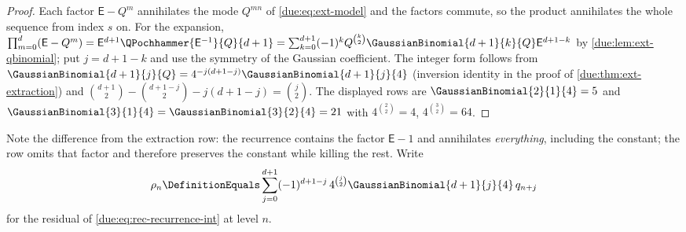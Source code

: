 \documentclass[11pt,oneside]{article}
\theoremstyle{plain}
\theoremstyle{definition}
\theoremstyle{remark}
\newcommand{\upn}[1]{\RvachevUp_{#1}}
\newcommand{\Qq}{Q}                                         %
\newcommand{\qn}[1]{q_{#1}}                                 %
\begin{document}
\begin{proof}
Each factor $\mathsf E-\Qq^{m}$ annihilates the mode $\Qq^{mn}$ of
\cref{due:eq:ext-model} and the factors commute, so the product annihilates
the whole sequence from index $s$ on.  For the expansion,
$\prod_{m=0}^{d}(\mathsf E-\Qq^{m})=\mathsf E^{d+1}\QPochhammer{\mathsf E^{-1}}{\Qq}{d+1}
=\sum_{k=0}^{d+1}(-1)^{k}\Qq^{\binom{k}{2}}\GaussianBinomial{d+1}{k}{\Qq}\mathsf E^{d+1-k}$
by \cref{due:lem:ext-qbinomial}; put $j=d+1-k$ and use the symmetry of the
Gaussian coefficient.  The integer form follows from
$\GaussianBinomial{d+1}{j}{\Qq}=4^{-j(d+1-j)}\GaussianBinomial{d+1}{j}{4}$
(inversion identity in the proof of \cref{due:thm:ext-extraction}) and
$\binom{d+1}{2}-\binom{d+1-j}{2}-j(d+1-j)=\binom{j}{2}$.
The displayed rows are $\GaussianBinomial{2}{1}{4}=5$ and
$\GaussianBinomial{3}{1}{4}=\GaussianBinomial{3}{2}{4}=21$ with
$4^{\binom{2}{2}}=4$, $4^{\binom{3}{2}}=64$.
\end{proof}

Note the difference from the extraction row: the recurrence contains the
factor $\mathsf E-1$ and annihilates \emph{everything}, including the
constant; the row omits that factor and therefore preserves the constant
while killing the rest.  Write
\begin{equation}
 \rho_{n}\DefinitionEquals
 \sum_{j=0}^{d+1}(-1)^{d+1-j}\,4^{\binom{j}{2}}\GaussianBinomial{d+1}{j}{4}\,\qn{n+j}
 \label{due:eq:rec-residual}
\end{equation}
for the residual of \cref{due:eq:rec-recurrence-int} at level $n$.
\end{document}
